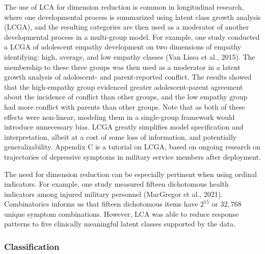 \documentclass[
  ,man,floatsintext]{apa6}
\begin{document}
The use of LCA for dimension reduction is common in longitudinal research,
where one developmental process is summarized using latent class growth analysis (LCGA),
and the resulting categories are then used as a moderator of another developmental process in a multi-group model.
For example, one study conducted a LCGA of adolescent empathy development on two dimensions of empathy identifying: high, average, and low empathy classes (Van Lissa et al., 2015).
The membership to these three groups was then used as a moderator in a latent growth analysis of adolescent- and parent-reported conflict.
The results showed that the high-empathy group evidenced greater adolescent-parent agreement about the incidence of conflict than other groups,
and the low empathy group had more conflict with parents than other groups.
Note that as both of these effects were non-linear,
modeling them in a single-group framework would introduce unnecessary bias.
LCGA greatly simplifies model specification and interpretation,
albeit at a cost of some loss of information, and potentially generalizability.
Appendix C is a tutorial on LCGA,
based on ongoing research on trajectories of depressive symptoms in military service members after deployment.

The need for dimension reduction can be especially pertinent when using ordinal indicators.
For example, one study measured
fifteen dichotomous health indicators among injured military personnel (MacGregor et al., 2021).
Combinatorics informs us that fifteen
dichotomous items have \(2^{15}\) or \(32,768\) unique symptom combinations.
However, LCA was able to reduce response patterns to five clinically meaningful latent classes supported by the data.

\hypertarget{classification}{%
\subsubsection{Classification}\label{classification}}
\end{document}
